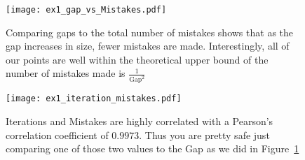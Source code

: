 \documentclass[12pt]{article}
\begin{document}
\begin{enumerate}
\begin{enumerate}
\begin{figure}[p]
\begin{center}
\texttt{[image: ex1\_gap\_vs\_Mistakes.pdf]}
\caption{Comparing gaps to the total number of mistakes shows that as the gap increases in size, fewer mistakes are made. Interestingly, all of our points are well within the theoretical upper bound of the number of mistakes made is $\frac{1}{\text{Gap}^2}$}
\label{fig:gvm}
\end{center}

\end{figure}
\begin{figure}[p]
\begin{center}
\texttt{[image: ex1\_iteration\_mistakes.pdf]}
\caption{Iterations and Mistakes are highly correlated with a Pearson's correlation coefficient of $0.9973$. Thus you are pretty safe just comparing one of those two values to the Gap as we did in Figure~\ref{fig:gvm}}
\label{fig:mvi}
\end{center}
\end{figure}

\end{enumerate}
\end{enumerate}
\end{document}
